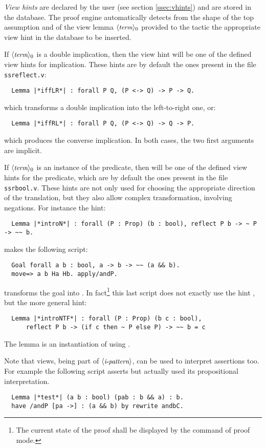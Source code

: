 \emph{View hints} are declared by the user (see section
\ref{ssec:vhints}) and are stored in the  database.
The proof engine automatically
detects from the shape of the top assumption  and of the view
lemma $\langle\mbox{\itshape\rmfamily\small term}\rangle_0$ provided to the tactic the appropriate view hint in
the database to be inserted.

If $\langle\mbox{\itshape\rmfamily\small term}\rangle_0$ is a double implication, then the view hint  will
be one of the defined view hints for implication. These hints are by
default the ones present in the file {\tt ssreflect.v}:
\begin{lstlisting}
  Lemma |*iffLR*| : forall P Q, (P <-> Q) -> P -> Q.
\end{lstlisting}
which transforms a double  implication into the left-to-right one, or:
\begin{lstlisting}
  Lemma |*iffRL*| : forall P Q, (P <-> Q) -> Q -> P.
\end{lstlisting}
which produces the converse implication. In both cases, the two first
 arguments are implicit.

If $\langle\mbox{\itshape\rmfamily\small term}\rangle_0$ is an instance of the  predicate, then 
will be one of the defined view hints  for the 
predicate,  which are by
default the ones present in the file {\tt ssrbool.v}.
These hints are not only used for choosing the appropriate direction of
the translation, but they also allow complex transformation, involving
negations.
 For instance the hint:
\begin{lstlisting}
  Lemma |*introN*| : forall (P : Prop) (b : bool), reflect P b -> ~ P -> ~~ b.
\end{lstlisting}
makes the following script:
\begin{lstlisting}
  Goal forall a b : bool, a -> b -> ~~ (a && b).
  move=> a b Ha Hb. apply/andP.
\end{lstlisting}
transforms the goal into .
In fact\footnote{The current state of the proof shall be displayed by
  the  command of \Coq{} proof mode.}
this last script does not exactly use the hint , but the
more general hint:
\begin{lstlisting}
  Lemma |*introNTF*| : forall (P : Prop) (b c : bool),
      reflect P b -> (if c then ~ P else P) -> ~~ b = c
\end{lstlisting}
The lemma  is an instantiation of  using
 .

Note that views, being part of $\langle\mbox{\itshape\rmfamily\small i-pattern}\rangle$, can be used to interpret
assertions too. For example the following script asserts 
but actually used its propositional interpretation.
\begin{lstlisting}
  Lemma |*test*| (a b : bool) (pab : b && a) : b.
  have /andP [pa ->] : (a && b) by rewrite andbC.
\end{lstlisting}

